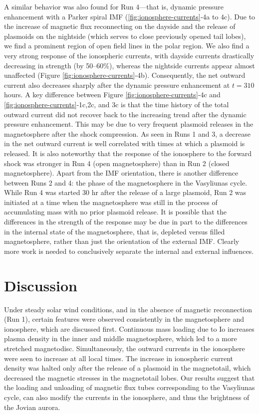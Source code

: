 A similar behavior was also found for Run 4—that is, dynamic pressure enhancement with a Parker spiral IMF (\ref{fig:ionosphere-currents}‐4a to 4c). Due to the increase of magnetic flux reconnecting on the dayside and the release of plasmoids on the nightside (which serves to close previously opened tail lobes), we find a prominent region of open field lines in the polar region. We also find a very strong response of the ionospheric currents, with dayside currents drastically decreasing in strength (by 50–60\%), whereas the nightside currents appear almost unaffected (Figure \ref{fig:ionosphere-currents}‐4b). Consequently, the net outward current also decreases sharply after the dynamic pressure enhancement at $t = 310$ hours. A key difference between Figure \ref{fig:ionosphere-currents}‐4c and \ref{fig:ionosphere-currents}‐1c,2c, and 3c is that the time history of the total outward current did not recover back to the increasing trend after the dynamic pressure enhancement. This may be due to very frequent plasmoid releases in the magnetosphere after the shock compression. As seen in Runs 1 and 3, a decrease in the net outward current is well correlated with times at which a plasmoid is released. It is also noteworthy that the response of the ionosphere to the forward shock was stronger in Run 4 (open magnetosphere) than in Run 2 (closed magnetosphere). Apart from the IMF orientation, there is another difference between Runs 2 and 4: the phase of the magnetosphere in the Vasyliunas cycle. While Run 4 was started 30 hr after the release of a large plasmoid, Run 2 was initiated at a time when the magnetosphere was still in the process of accumulating mass with no prior plasmoid release. It is possible that the differences in the strength of the response may be due in part to the differences in the internal state of the magnetosphere, that is, depleted versus filled magnetosphere, rather than just the orientation of the external IMF. Clearly more work is needed to conclusively separate the internal and external influences. 

\section{Discussion}

Under steady solar wind conditions, and in the absence of magnetic reconnection (Run 1), certain features were observed consistently in the magnetosphere and ionosphere, which are discussed first. Continuous mass loading due to Io increases plasma density in the inner and middle magnetosphere, which led to a more stretched magnetodisc. Simultaneously, the outward currents in the ionosphere were seen to increase at all local times. The increase in ionospheric current density was halted only after the release of a plasmoid in the magnetotail, which decreased the magnetic stresses in the magnetotail lobes. Our results suggest that the loading and unloading of magnetic flux tubes corresponding to the Vasyliunas cycle, can also modify the currents in the ionosphere, and thus the brightness of the Jovian aurora. 

